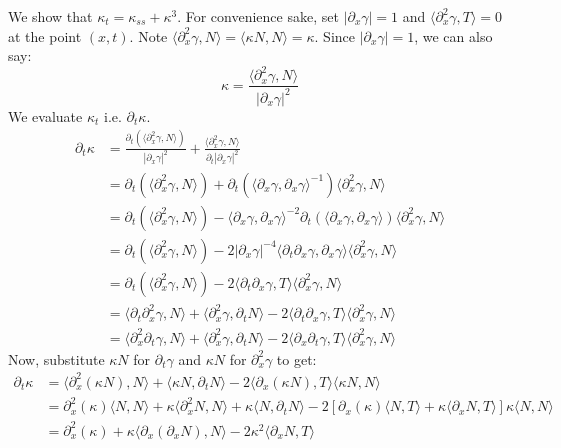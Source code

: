 \documentclass{article}
\begin{document}
We show that $\kappa_t = \kappa_{ss} + \kappa^3$. For convenience sake, set $|\partial_x \gamma| = 1$ and $\langle \partial_x^2 \gamma, T\rangle = 0$ at the point $(x,t)$.
Note $\langle \partial_x^2 \gamma, N\rangle = \langle \kappa N, N\rangle = \kappa$. Since $|\partial_x \gamma| = 1$, we can also say:
\[ \kappa = \frac{\langle \partial_x^2 \gamma, N\rangle}{|\partial_x \gamma|^2} \]
We evaluate $\kappa_t$ i.e. $\partial_t \kappa$.
\begin{align*}
    \partial_t \kappa &= \frac{\partial_t(\langle \partial_x^2 \gamma, N\rangle)}{|\partial_x \gamma|^2} + \frac{\langle \partial_x^2 \gamma, N\rangle}{\partial_t  |\partial_x \gamma|^2} \\
        &= \partial_t(\langle \partial_x^2 \gamma, N\rangle) + \partial_t (\langle \partial_x \gamma, \partial_x \gamma\rangle^{-1})\langle \partial_x^2 \gamma, N\rangle \\
        &= \partial_t(\langle \partial_x^2 \gamma, N\rangle) - \langle \partial_x \gamma, \partial_x \gamma\rangle^{-2}\partial_t (\langle \partial_x\gamma, \partial_x\gamma\rangle) \langle \partial_x^2 \gamma, N\rangle \\
        &= \partial_t(\langle \partial_x^2 \gamma, N\rangle) - 2|\partial_x \gamma|^{-4}\langle \partial_t \partial_x\gamma, \partial_x\gamma\rangle \langle \partial_x^2 \gamma, N\rangle \\
        &= \partial_t(\langle \partial_x^2 \gamma, N\rangle) - 2\langle \partial_t \partial_x\gamma, T\rangle \langle \partial_x^2 \gamma, N\rangle \\
        &= \langle \partial_t \partial_x^2 \gamma, N\rangle + \langle \partial_x^2 \gamma, \partial_t N\rangle - 2\langle \partial_t \partial_x\gamma, T\rangle \langle \partial_x^2 \gamma, N\rangle \\
        &= \langle \partial_x^2 \partial_t \gamma, N\rangle + \langle \partial_x^2 \gamma, \partial_t N\rangle - 2\langle \partial_x \partial_t\gamma, T\rangle \langle \partial_x^2 \gamma, N\rangle
\end{align*}
Now, substitute $\kappa N$ for $\partial_t \gamma$ and $\kappa N$ for $\partial_x^2 \gamma$ to get:
\begin{align*}
    \partial_t \kappa &= \langle \partial_x^2 (\kappa N), N\rangle + \langle \kappa N, \partial_t N\rangle - 2\langle \partial_x (\kappa N), T\rangle \langle \kappa N, N\rangle \\
        &= \partial_x^2 (\kappa)\langle N, N\rangle + \kappa\langle \partial_x^2 N, N\rangle + \kappa\langle N, \partial_t N\rangle - 2[\partial_x (\kappa)\langle N, T\rangle +
            \kappa\langle \partial_x N, T\rangle]\kappa\langle N, N\rangle \\
        &= \partial_x^2 (\kappa) + \kappa\langle \partial_x(\partial_x N), N\rangle - 2\kappa^2\langle \partial_x N, T\rangle
\end{align*}
\end{document}
